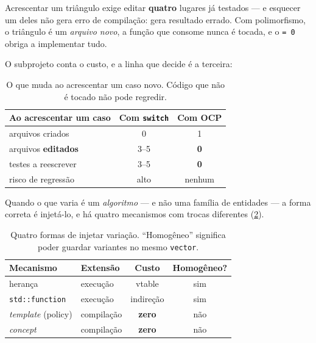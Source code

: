 Acrescentar um triângulo exige editar \textbf{quatro} lugares já testados --- e
esquecer um deles não gera erro de compilação: gera resultado errado. Com
polimorfismo, o triângulo é um \emph{arquivo novo}, a função que consome nunca é
tocada, e o \texttt{= 0} obriga a implementar tudo.

O subprojeto conta o custo, e a linha que decide é a terceira:

\begin{table}[htbp]
\centering
\caption{O que muda ao acrescentar um caso novo. Código que não é tocado não
         pode regredir.}
\label{tab:ocp-custo}
\footnotesize
\begin{tabular}{@{}lcc@{}}
\toprule
\textbf{Ao acrescentar um caso} & \textbf{Com \texttt{switch}} & \textbf{Com OCP} \\
\midrule
arquivos criados          & 0      & 1 \\
arquivos \textbf{editados}& 3--5   & \textbf{0} \\
testes a reescrever       & 3--5   & \textbf{0} \\
risco de regressão        & alto   & nenhum \\
\bottomrule
\end{tabular}
\end{table}

Quando o que varia é um \emph{algoritmo} --- e não uma família de entidades ---
a forma correta é injetá-lo, e há quatro mecanismos com trocas diferentes
(\cref{tab:ocp-mecanismos}).

\begin{table}[htbp]
\centering
\caption{Quatro formas de injetar variação. ``Homogêneo'' significa poder
         guardar variantes no mesmo \texttt{vector}.}
\label{tab:ocp-mecanismos}
\footnotesize
\begin{tabular}{@{}llcc@{}}
\toprule
\textbf{Mecanismo} & \textbf{Extensão} & \textbf{Custo} & \textbf{Homogêneo?} \\
\midrule
herança                  & execução   & \gls{vtable}   & sim \\
\texttt{std::function}   & execução   & indireção      & sim \\
\emph{template} (policy) & compilação & \textbf{zero}  & não \\
\emph{concept}           & compilação & \textbf{zero}  & não \\
\bottomrule
\end{tabular}
\end{table}

